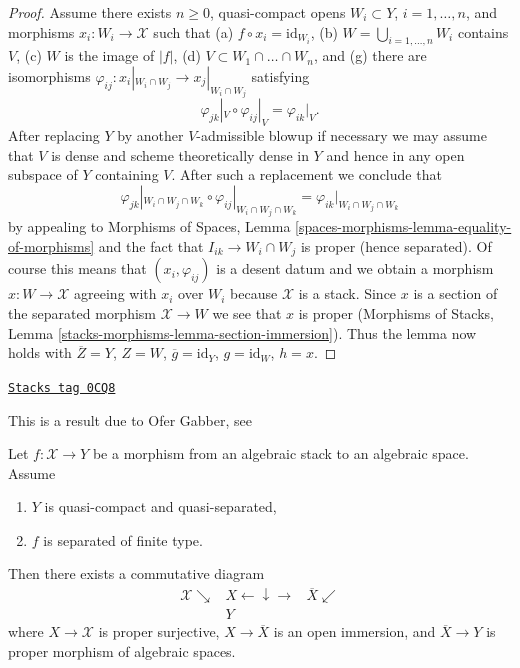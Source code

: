 \begin{proof}
\medskip\noindent
Assume there exists $n \geq 0$, quasi-compact opens
$W_i \subset Y$, $i = 1, \ldots, n$, and
morphisms $x_i : W_i \to \mathcal{X}$ such that
(a) $f \circ x_i = \text{id}_{W_i}$,
(b) $W = \bigcup_{i = 1, \ldots, n} W_i$ contains $V$,
(c) $W$ is the image of $|f|$,
(d) $V \subset W_1 \cap \ldots \cap W_n$, and
(g) there are isomorphisms
$\varphi_{ij} : x_i|_{W_i \cap W_j} \to x_j|_{W_i \cap W_j}$
satisfying
$$
\varphi_{jk}|_V \circ \varphi_{ij}|_V = \varphi_{ik}|_V.
$$
After replacing $Y$ by another $V$-admissible blowup if necessary
we may assume that $V$ is dense and scheme theoretically dense
in $Y$ and hence in any open subspace of $Y$ containing $V$.
After such a replacement we conclude that
$$
\varphi_{jk}|_{W_i \cap W_j \cap W_k} \circ
\varphi_{ij}|_{W_i \cap W_j \cap W_k} =
\varphi_{ik}|_{W_i \cap W_j \cap W_k}
$$
by appealing to Morphisms of Spaces, Lemma
\ref{spaces-morphisms-lemma-equality-of-morphisms}
and the fact that $I_{ik} \to W_i \cap W_j$ is proper
(hence separated).
Of course this means that $(x_i, \varphi_{ij})$
is a desent datum and we obtain a morphism
$x : W \to \mathcal{X}$ agreeing with $x_i$ over $W_i$
because $\mathcal{X}$ is a stack.
Since $x$ is a section of the separated morphism
$\mathcal{X} \to W$ we see that $x$ is proper
(Morphisms of Stacks, Lemma \ref{stacks-morphisms-lemma-section-immersion}).
Thus the lemma now holds with $\overline{Z} = Y$,
$Z = W$, $\overline{g} = \text{id}_Y$, $g = \text{id}_W$,
$h = x$.
\end{proof}

\begin{theorem}

\label{stacks-more-morphisms-theorem-chow-finite-type}
\href{https://stacks.math.columbia.edu/tag/0CQ8}{\texttt{Stacks tag 0CQ8}}

\begin{reference}
This is a result due to Ofer Gabber, see
\cite[Theorem 1.1]{olsson_proper}
\end{reference}
Let $f : \mathcal{X} \to Y$ be a morphism from an algebraic stack
to an algebraic space. Assume
\begin{enumerate}
\item $Y$ is quasi-compact and quasi-separated,
\item $f$ is separated of finite type.
\end{enumerate}
Then there exists a commutative diagram
$$
\begin{array}{ccc}\mathcal{X} \searrow & X \longleftarrow\downarrow\longrightarrow & \overline{X} \swarrow \\  & Y & \end{array}
$$
where $X \to \mathcal{X}$ is proper surjective,
$X \to \overline{X}$ is an open immersion, and
$\overline{X} \to Y$ is proper morphism of algebraic spaces.
\end{theorem}

